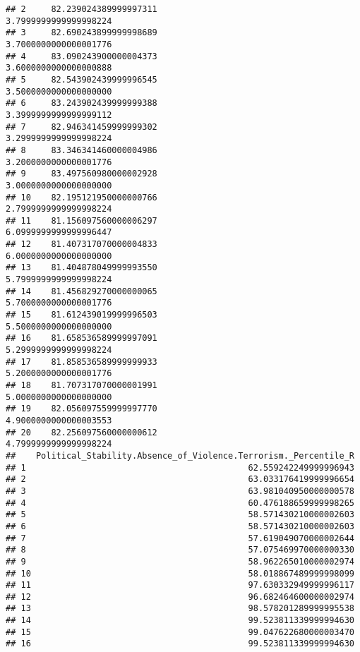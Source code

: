 \documentclass[
]{article}
\begin{document}
\begin{verbatim}
## 2     82.239024389999997311                        3.7999999999999998224
## 3     82.690243899999998689                        3.7000000000000001776
## 4     83.090243900000004373                        3.6000000000000000888
## 5     82.543902439999996545                        3.5000000000000000000
## 6     83.243902439999999388                        3.3999999999999999112
## 7     82.946341459999999302                        3.2999999999999998224
## 8     83.346341460000004986                        3.2000000000000001776
## 9     83.497560980000002928                        3.0000000000000000000
## 10    82.195121950000000766                        2.7999999999999998224
## 11    81.156097560000006297                        6.0999999999999996447
## 12    81.407317070000004833                        6.0000000000000000000
## 13    81.404878049999993550                        5.7999999999999998224
## 14    81.456829270000000065                        5.7000000000000001776
## 15    81.612439019999996503                        5.5000000000000000000
## 16    81.658536589999997091                        5.2999999999999998224
## 17    81.858536589999999933                        5.2000000000000001776
## 18    81.707317070000001991                        5.0000000000000000000
## 19    82.056097559999997770                        4.9000000000000003553
## 20    82.256097560000000612                        4.7999999999999998224
##    Political_Stability.Absence_of_Violence.Terrorism._Percentile_R
## 1                                            62.559242249999996943
## 2                                            63.033176419999996654
## 3                                            63.981040950000000578
## 4                                            60.476188659999998265
## 5                                            58.571430210000002603
## 6                                            58.571430210000002603
## 7                                            57.619049070000002644
## 8                                            57.075469970000000330
## 9                                            58.962265010000002974
## 10                                           58.018867489999998099
## 11                                           97.630332949999996117
## 12                                           96.682464600000002974
## 13                                           98.578201289999995538
## 14                                           99.523811339999994630
## 15                                           99.047622680000003470
## 16                                           99.523811339999994630

\end{verbatim}
\end{document}
